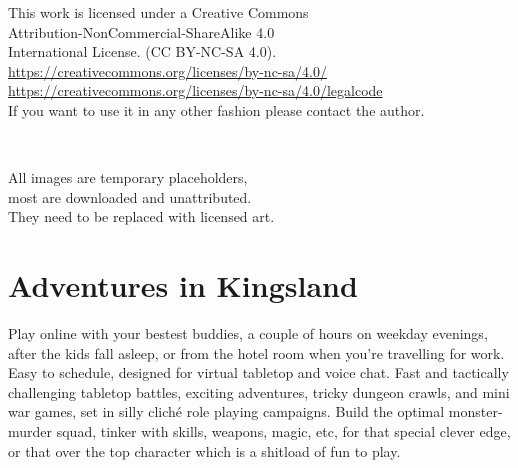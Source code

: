\clearpage
\thispagestyle{empty}
\raggedbottom

\vsmall
\noindent
This work is licensed under a Creative Commons \\
Attribution-NonCommercial-ShareAlike 4.0 \\
International License. (CC BY-NC-SA 4.0).\\
\url{https://creativecommons.org/licenses/by-nc-sa/4.0/} \\
\url{https://creativecommons.org/licenses/by-nc-sa/4.0/legalcode} \\
If you want to use it in any other fashion please contact the author.

\

\noindent
All images are temporary placeholders, \\
most are downloaded and unattributed.\\
They need to be replaced with licensed art.

\normalsize






\cleardoublepage
\pagestyle{fancy}
\raggedbottom






\section*{Adventures in Kingsland}

\noindent
Play online with your bestest buddies, a couple of hours on weekday evenings, after the kids fall asleep, or from the hotel room when you're travelling for work. Easy to schedule, designed for virtual tabletop and voice chat.
Fast and tactically challenging tabletop battles, exciting adventures, tricky dungeon crawls, and mini war games, set in silly cliché role playing campaigns.
Build the optimal monster-murder squad, tinker with skills, weapons, magic, etc, for that special clever edge, or that over the top character which is a shitload of fun to play.

